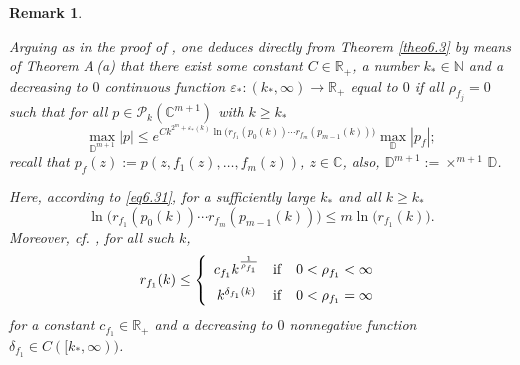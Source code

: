 \documentclass[11pt, oneside]{amsart}
\newtheorem{R}[Th]{Remark}
\begin{document}
\begin{R}\label{rem6.6}
{\rm Arguing as in the proof of \cite[Th.\,2.3]{B}, one deduces directly from Theorem \ref{theo6.3} by means of Theorem A\,(a) that there exist some constant $C\in\mathbb R_+$, a number $k_*\in\mathbb N$ and a  decreasing to $0$ continuous function $\varepsilon_*: (k_*,\infty)\rightarrow\mathbb R_+$ equal to $0$ if all $\rho_{f_j}=0$ such that for all $p\in\mathcal P_k(\mathbb C^{m+1})$ with $k\ge k_*$ 
\begin{equation}
\max_{\mathbb D^{m+1}} |p|\le e^{C k^{2^{m}+\varepsilon_*(k)}\ln\bigl(r_{f_1}(p_0(k))\cdots r_{f_m}(p_{m-1}(k))\bigr)}\max_{\mathbb D}|p_f|;
\end{equation}\label{equ6.50}
recall that $p_f(z):=p(z,f_1(z),\dots, f_m(z))$, $z\in\mathbb C$, also, $\mathbb D^{m+1}:=\times^{m+1}\,\mathbb D$.

Here, according to \eqref{eq6.31}, for a sufficiently large $k_*$ and all $k\ge k_*$
\[
\ln\bigl(r_{f_1}(p_0(k))\cdots r_{f_m}(p_{m-1}(k))\bigr)\le m\ln\bigl(r_{f_1}(k)\bigr).
\]
Moreover, cf. \cite[Th.\,2.8]{B}, for all such $k$,
\[
r_{f_1}(k)\le\left\{
\begin{array}{ccc}
c_{f_1}k^{\frac{1}{\rho_{f_1}}}&{\rm if}&0<\rho_{f_1}<\infty\medskip\\
k^{\delta_{f_1}(k)}&{\rm if}&0<\rho_{f_1}=\infty
\end{array}
\right.
\]
for a constant $c_{f_1}\in\mathbb R_+$ and a decreasing to $0$ nonnegative function $\delta_{f_1}\in C([k_*,\infty))$.
}
\end{R}
\end{document}
